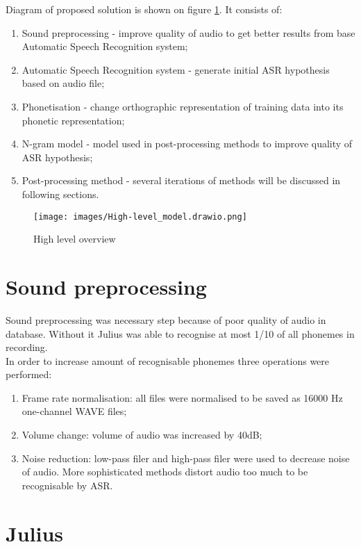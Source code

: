 \documentclass[a4paper,11pt,twoside]{report}
\theoremstyle{definition}
\begin{document}
Diagram of proposed solution is shown on figure \ref{img:methodoverwiew}. It consists of:
\begin{enumerate}
    \item Sound preprocessing - improve quality of audio to get better results from base Automatic Speech Recognition system;
    \item Automatic Speech Recognition system - generate initial ASR hypothesis based on audio file;
    \item Phonetisation - change orthographic representation of training data into its phonetic representation;
    \item N-gram model - model used in post-processing methods to improve quality of ASR hypothesis;
    \item Post-processing method - several iterations of methods will be discussed in following sections.
\end{enumerate}

\begin{figure}[H]{}
    \centering
    \texttt{[image: images/High-level\_model.drawio.png]}
    \caption{High level overview}
    \label{img:methodoverwiew}
\end{figure}

\section{Sound preprocessing}

Sound preprocessing was necessary step because of poor quality of audio in database. Without it Julius was able to recognise at most 1/10 of all phonemes in recording.\\
In order to increase amount of recognisable phonemes three operations were performed:
\begin{enumerate}
    \item Frame rate normalisation: all files were normalised to be saved as 16000 Hz one-channel WAVE files;
    \item Volume change: volume of audio was increased by 40dB;
    \item Noise reduction: low-pass filer and high-pass filer were used to decrease noise of audio. More sophisticated methods distort audio too much to be recognisable by ASR.
\end{enumerate}

\section{Julius}
\end{document}
